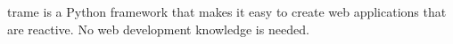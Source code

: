 trame \cite{trame} is a Python framework that makes it easy to create web applications that are
reactive. No web development knowledge is needed.